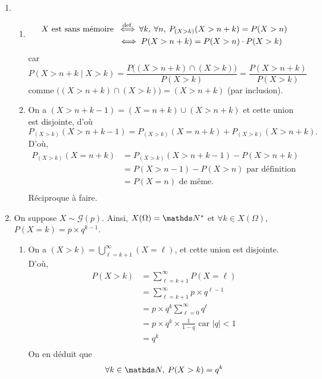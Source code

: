 \begin{exo}
  \begin{enumerate}
    \item
      \begin{enumerate}
        \item
          \begin{align*}
            X \text{ est sans mémoire } &\mathop{\iff}^{\text{def.}} \forall k,\:\forall n,\: P_{(X > k)}(X > n + k) = P(X > n)\\
            &\iff P(X > n + k) = P(X > n) \cdot P(X > k)
          \end{align*}
          car \[
            P(X > n + k  \mid X > k) = \frac{P\big((X > n + k) \cap (X > k)\big)}{P(X > k)} = \frac{P(X > n + k)}{P(X> k)}
          \] comme $\big((X > n + k) \cap (X > k)\big) = (X > n+k)$\/ (par inclusion).
        \item On a $(X > n + k - 1) = (X = n + k) \cup (X > n + k)$\/ et cette union est disjointe, d'où \[
          P_{(X > k)}(X > n + k - 1) = P_{(X > k)}(X = n+k) + P_{(X > k)}(X > n + k)
        .\] D'où,
        \begin{align*}
          P_{(X > k)}(X = n+k) &= P_{(X > k)}(X > n + k - 1) - P(X > n + k) \\
          &= P(X > n - 1) - P(X > n) \text{ par définition} \\
          &= P(X = n) \text{ de même}. \\
        \end{align*}
        Réciproque à faire.
      \end{enumerate}
    \item On suppose $X \sim \mathcal{G}(p)$. Ainsi, $X(\Omega) = \N^*$\/ et $\forall k \in X(\Omega)$, $P(X = k) = p \times q^{k-1}$.
      \begin{enumerate}
        \item On a $(X > k) = \bigcup_{\ell=k+1}^\infty (X = \ell)$, et cette union est disjointe. D'où,
          \begin{align*}
            P(X > k) &= \sum_{\ell = k + 1}^\infty P(X = \ell) \\
            &= \sum_{\ell = k + 1}^\infty p \times q^{\ell - 1} \\
            &= p \times q^k \sum_{\ell=0}^\infty q^\ell \\
            &= p \times q^k \times \frac{1}{1-q} \text{ car } |q| < 1 \\
            &= q^k \\
          \end{align*}
          On en déduit que \[
            \forall k \in \N,\:P(X > k) = q^k
\]
\end{enumerate}
\end{enumerate}
\end{exo}

